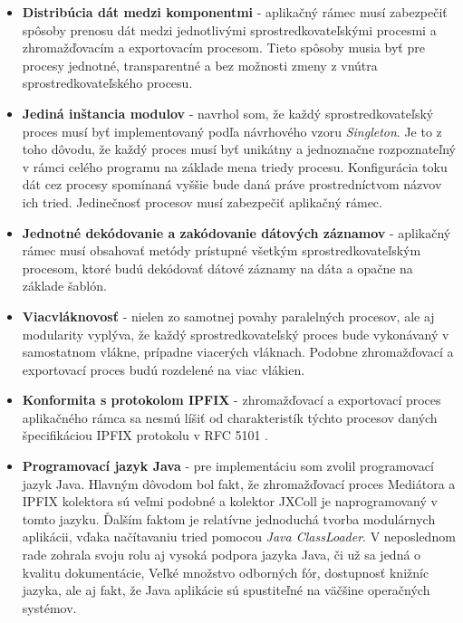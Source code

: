 \begin{itemize}
 \item \textbf{Distribúcia dát medzi komponentmi} - aplikačný rámec musí zabezpečiť spôsoby prenosu dát medzi 
 jednotlivými sprostredkovateľskými procesmi a zhromažďovacím a exportovacím procesom. Tieto spôsoby 
 musia byť pre procesy jednotné, transparentné a bez možnosti zmeny z vnútra sprostredkovateľského procesu.
 
 \item \textbf{Jediná inštancia modulov} - navrhol som, že každý sprostredkovateľský
 proces musí byť implementovaný podľa návrhového vzoru \emph{Singleton}. Je to z toho dôvodu, že 
 každý proces musí byť unikátny a jednoznačne rozpoznateľný v rámci celého programu na 
 základe mena triedy procesu. Konfigurácia toku dát cez procesy spomínaná vyššie bude daná práve 
 prostredníctvom názvov ich tried. Jedinečnosť procesov musí zabezpečiť aplikačný rámec. 
 
 \item \textbf{Jednotné dekódovanie a zakódovanie dátových záznamov} - aplikačný rámec musí obsahovať metódy 
 prístupné všetkým sprostredkovateľským procesom, ktoré budú dekódovať dátové záznamy na dáta a opačne
 na základe šablón.
 
 \item \textbf{Viacvláknovosť} - nielen zo samotnej povahy paralelných procesov, ale aj modularity vyplýva, 
 že každý sprostredkovateľský proces bude vykonávaný v samostatnom vlákne, prípadne viacerých vláknach. 
 Podobne zhromažďovací a exportovací proces budú rozdelené na viac vlákien. 
 

 \item \textbf{Konformita s protokolom IPFIX} - zhromažďovací a exportovací proces aplikačného rámca sa 
 nesmú líšiť od charakteristík týchto procesov daných špecifikáciou IPFIX protokolu v RFC 5101 \citep{rfc5101}.
 
 \item \textbf{Programovací jazyk Java} - pre implementáciu som zvolil programovací jazyk Java.
 Hlavným dôvodom bol fakt, že zhromažďovací proces Mediátora a IPFIX kolektora sú veľmi podobné a kolektor 
 JXColl je naprogramovaný v tomto jazyku. Ďalším faktom je relatívne jednoduchá tvorba modulárnych aplikácii,
 vďaka načítavaniu tried pomocou \emph{Java ClassLoader}. V neposlednom rade zohrala svoju rolu aj vysoká
 podpora jazyka Java, či už sa jedná o kvalitu dokumentácie, Veľké množstvo odborných fór, dostupnosť 
 knižníc jazyka, ale aj fakt, že Java aplikácie sú spustiteľné na väčšine operačných systémov.
\end{itemize}



